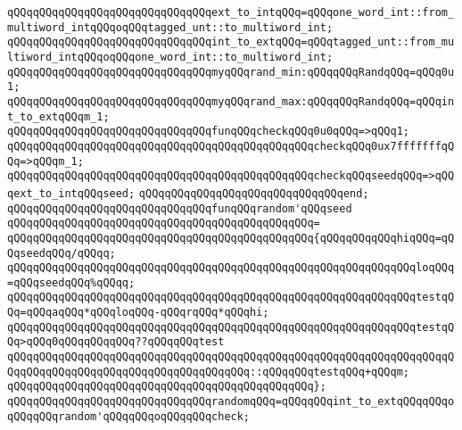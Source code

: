 \newline
\verb|qQQqqQQqqQQqqQQqqQQqqQQqqQQqqQQqext_to_intqQQq=qQQqone_word_int::from_multiword_intqQQqoqQQqtagged_unt::to_multiword_int;|\newline
\verb|qQQqqQQqqQQqqQQqqQQqqQQqqQQqqQQqint_to_extqQQq=qQQqtagged_unt::from_multiword_intqQQqoqQQqone_word_int::to_multiword_int;|\newline
\newline
\verb|qQQqqQQqqQQqqQQqqQQqqQQqqQQqqQQqmyqQQqrand_min:qQQqqQQqRandqQQq=qQQq0u1;|\newline
\verb|qQQqqQQqqQQqqQQqqQQqqQQqqQQqqQQqmyqQQqrand_max:qQQqqQQqRandqQQq=qQQqint_to_extqQQqm_1;|\newline
\newline
\verb|qQQqqQQqqQQqqQQqqQQqqQQqqQQqqQQqfunqQQqcheckqQQq0u0qQQq=>qQQq1;|\newline
\verb|qQQqqQQqqQQqqQQqqQQqqQQqqQQqqQQqqQQqqQQqqQQqqQQqcheckqQQq0ux7fffffffqQQq=>qQQqm_1;|\newline
\verb|qQQqqQQqqQQqqQQqqQQqqQQqqQQqqQQqqQQqqQQqqQQqqQQqcheckqQQqseedqQQq=>qQQqext_to_intqQQqseed;|\newline
\verb|qQQqqQQqqQQqqQQqqQQqqQQqqQQqqQQqend;|\newline
\newline
\verb|qQQqqQQqqQQqqQQqqQQqqQQqqQQqqQQqfunqQQqrandom'qQQqseed|\newline
\verb|qQQqqQQqqQQqqQQqqQQqqQQqqQQqqQQqqQQqqQQqqQQqqQQq=|\newline
\verb|qQQqqQQqqQQqqQQqqQQqqQQqqQQqqQQqqQQqqQQqqQQqqQQq{qQQqqQQqqQQqhiqQQq=qQQqseedqQQq/qQQqq;|\newline
\verb|qQQqqQQqqQQqqQQqqQQqqQQqqQQqqQQqqQQqqQQqqQQqqQQqqQQqqQQqqQQqqQQqloqQQq=qQQqseedqQQq%qQQqq;|\newline
\verb|qQQqqQQqqQQqqQQqqQQqqQQqqQQqqQQqqQQqqQQqqQQqqQQqqQQqqQQqqQQqqQQqtestqQQq=qQQqaqQQq*qQQqloqQQq-qQQqrqQQq*qQQqhi;|\newline
\newline
\verb|qQQqqQQqqQQqqQQqqQQqqQQqqQQqqQQqqQQqqQQqqQQqqQQqqQQqqQQqqQQqqQQqtestqQQq>qQQq0qQQqqQQqqQQq??qQQqqQQqtest|\newline
\verb|qQQqqQQqqQQqqQQqqQQqqQQqqQQqqQQqqQQqqQQqqQQqqQQqqQQqqQQqqQQqqQQqqQQqqQQqqQQqqQQqqQQqqQQqqQQqqQQqqQQqqQQqqQQq::qQQqqQQqtestqQQq+qQQqm;|\newline
\verb|qQQqqQQqqQQqqQQqqQQqqQQqqQQqqQQqqQQqqQQqqQQqqQQq};|\newline
\newline
\verb|qQQqqQQqqQQqqQQqqQQqqQQqqQQqqQQqrandomqQQq=qQQqqQQqint_to_extqQQqqQQqoqQQqqQQqrandom'qQQqqQQqoqQQqqQQqcheck;|\newline
